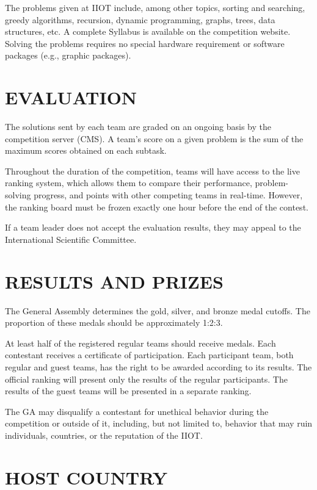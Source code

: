 \documentclass{article}
\begin{document}
The problems given at IIOT include, among other topics, sorting and searching, greedy algorithms, recursion, dynamic programming, graphs, trees, data structures, etc. A complete Syllabus is available on the competition website. Solving the problems requires no special hardware requirement or software packages (e.g., graphic packages). 


\section{EVALUATION} 

The solutions sent by each team are graded on an ongoing basis by the competition server (CMS). A team's score on a given problem is the sum of the maximum scores obtained on each subtask.

Throughout the duration of the competition, teams will have access to the live ranking system, which allows them to compare their performance, problem-solving progress, and points with other competing teams in real-time. However, the ranking board must be frozen exactly one hour before the end of the contest.

If a team leader does not accept the evaluation results, they may appeal to the International Scientific Committee. 

\section{RESULTS AND PRIZES} 

The General Assembly determines the gold, silver, and bronze medal cutoffs. The proportion of these medals should be approximately 1:2:3. 

At least half of the registered regular teams should receive medals. Each contestant receives a certificate of participation. Each participant team, both regular and guest teams, has the right to be awarded according to its results. The official ranking will present only the results of the regular participants. The results of the guest teams will be presented in a separate ranking. 

The GA may disqualify a contestant for unethical behavior during the competition or outside of it, including, but not limited to, behavior that may ruin individuals, countries, or the reputation of the IIOT. 

\section{HOST COUNTRY} 
\end{document}

